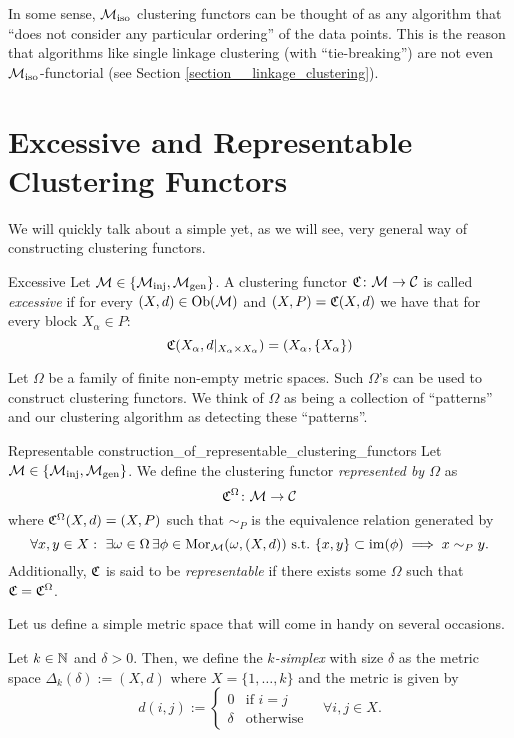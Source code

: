 
In some sense, ${\mathcal{M}_\mathrm{iso}}$ clustering functors can be thought of as any algorithm that ``does not consider any particular ordering'' of the data points.
This is the reason that algorithms like single linkage clustering (with ``tie-breaking'') are not even ${\mathcal{M}_\mathrm{iso}}$-functorial (see Section \ref{section__linkage_clustering}).

\section{Excessive and Representable Clustering Functors}

We will quickly talk about a simple yet, as we will see, very general way of constructing clustering functors.

\begin{definition}{Excessive \cite[Def.~6.2]{Carlsson2010}}{}
Let $\mathcal{M} \in \{{\mathcal{M}_\mathrm{inj}}, {\mathcal{M}_\mathrm{gen}}\}$. A clustering functor $\mathfrak{C}\colon \mathcal{M} \to \mathcal{C}$ is called \emph{excessive} if for every $(X,d) \in \mathrm {Ob}(\mathcal{M})$ and $(X,P) = \mathfrak{C}(X,d)$ we have that for every block $X_\alpha \in P$:
$$
\mathfrak{C}(X_\alpha, d|_{X_\alpha \times X_\alpha}) = (X_\alpha, \{X_\alpha\})
$$
\end{definition}

Let $\Omega$ be a family of finite non-empty metric spaces. Such $\Omega$'s can be used to construct clustering functors. We think of $\Omega$ as being a collection of ``patterns'' and our clustering algorithm as detecting these ``patterns''.

\begin{definition}{Representable \cite[Sec.~6.2]{Carlsson2010}}{construction_of_representable_clustering_functors}
Let $\mathcal{M} \in \{{\mathcal{M}_\mathrm{inj}}, {\mathcal{M}_\mathrm{gen}}\}$. We define the clustering functor \emph{represented by $\Omega$} as
$$
\mathfrak{C}^\Omega\colon \mathcal{M} \to \mathcal{C}
$$
where $\mathfrak{C}^\Omega(X,d) = (X, P)$ such that $\sim_P$ 
is the equivalence relation generated by
\begin{equation*}
    \forall x,y \in X: \ \exists \omega \in \Omega \,\exists \phi \in \mathrm {Mor}_{\mathcal{M}}(\omega, (X,d)) \ \text{s.t.} \ \{x,y\} \subset \operatorname*{im}(\phi) \implies x \sim_P y.
\end{equation*}
Additionally, $\mathfrak{C}$ is said to be \emph{representable} if there exists some $\Omega$ such that $\mathfrak{C} = \mathfrak{C}^\Omega$.
\end{definition}

Let us define a simple metric space that will come in handy on several occasions.
\begin{definition}{}{}
    Let $k \in \mathbb N$ and $\delta > 0$. Then, we define the \emph{$k$-simplex} with size $\delta$ as the metric space $\Delta_k(\delta) := (X,d)$ where $X = \{1, \dots, k\}$ and the metric is given by
    $$
    d(i,j) := \begin{cases}
        0 & \text{if } i = j\\
        \delta & \text{otherwise}
    \end{cases} \quad \forall i,j \in X.
    $$
\end{definition}


